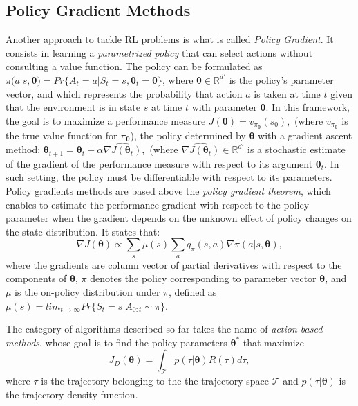 \subsection{Policy Gradient Methods}
Another approach to tackle RL problems is what is called \textit{Policy Gradient}. It consists in learning a \textit{parametrized policy} that can select actions without consulting a value function. The policy can be formulated as \(\pi(a|s,\boldsymbol \theta)=Pr\{A_t=a|S_t=s,\boldsymbol \theta_t=\boldsymbol \theta\}\), where $\boldsymbol \theta \in \mathbb{R}^{d'}$ is the policy's parameter vector, and which represents the probability that action $a$ is taken at time $t$ given that the environment is in state $s$ at time $t$ with parameter $\boldsymbol \theta$. In this framework, the goal is to maximize a performance measure $J(\boldsymbol \theta)=v_{\pi_{\boldsymbol \theta}}(s_0),$ (where $v_{\pi_{\boldsymbol \theta}}$ is the true value function for $\pi_{\boldsymbol \theta}$), the policy determined by $\boldsymbol \theta$ with a gradient ascent method: \(\boldsymbol \theta_{t+1}= \boldsymbol \theta_t+\alpha \widehat{\nabla J(\boldsymbol \theta_t)},\) (where $\widehat{\nabla J(\boldsymbol \theta_t)} \in \mathbb{R}^{d'}$ is a stochastic estimate of the gradient of the performance measure with respect to its argument $\boldsymbol \theta_t$. In such setting, the policy must be differentiable with respect to its parameters.
Policy gradients methods are based above the \textit{policy gradient theorem}, which enables to estimate the performance gradient with respect to the policy parameter when the gradient depends on the unknown effect of policy changes on the state distribution. It states that:
\begin{equation}\nabla J(\boldsymbol \theta) \propto \sum_s \mu(s )\sum_a q_\pi (s,a) \nabla \pi (a|s,\boldsymbol \theta),\end{equation} where the gradients are column vector of partial derivatives with respect to the components of $\boldsymbol \theta$, $\pi$ denotes the policy corresponding to parameter vector $\boldsymbol \theta$, and $\mu$ is the on-policy distribution under $\pi$, defined as $\mu(s) = lim_{t \rightarrow \infty}Pr\{S_t=s|A_{0:t} \sim \pi\}$.

The category of algorithms described so far takes the name of \textit{action-based methods}, whose goal is to find the policy parameters \( \boldsymbol \theta^*\) that maximize
\begin{equation} J_D(\boldsymbol \theta) = \int_{\mathcal{T}} p(\tau|\boldsymbol \theta)R(\tau)d\tau, \label{eq:jdtheta} \end{equation} 
where \(\tau\) is the trajectory belonging to the the trajectory space $\mathcal{T}$ and $p(\tau|\boldsymbol \theta)$ is the trajectory density function.





